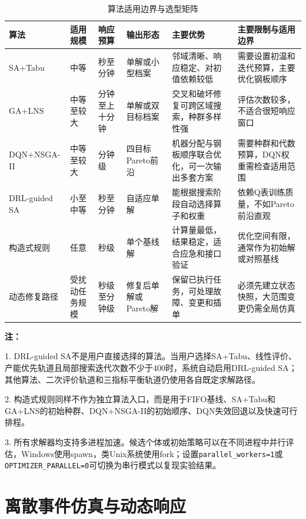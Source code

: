 \documentclass[UTF8,zihao=-4,openany]{ctexrep}
\newcommand{\code}[1]{\texttt{#1}}
\begin{document}
\begin{table}[H]
\centering
\caption{算法适用边界与选型矩阵}
\small
\begin{tabularx}{\textwidth}{p{}p{}p{}p{}YY}
\toprule
算法 & 适用规模 & 响应预算 & 输出形态 & 主要优势 & 主要限制与适用边界 \\
\midrule
SA+Tabu & 中等 & 秒至分钟 & 单解或小型档案 & 邻域清晰、响应稳定、对初值依赖较低 & 需要设置初温和迭代预算，主要优化钢板顺序 \\
GA+LNS & 中等至较大 & 分钟至上十分钟 & 单解或双目标档案 & 交叉和破坏修复可跨区域搜索，种群多样性强 & 评估次数较多，不适合很短响应窗口 \\
DQN+NSGA-II & 中等至较大 & 分钟级 & 四目标Pareto前沿 & 机器分配与钢板顺序联合优化，可一次输出多套方案 & 需要种群和代数预算，DQN权重需检查适用范围 \\
DRL-guided SA & 小至中等 & 秒至分钟 & 自适应单解 & 能根据搜索阶段自动选择算子和权重 & 依赖Q表训练质量，不如Pareto前沿直观 \\
构造式规则 & 任意 & 秒级 & 单个基线解 & 计算量最低，结果稳定，适合应急和接口验证 & 优化空间有限，通常作为初始解或对照基线 \\
动态修复路径 & 受扰动任务规模 & 秒级至分钟级 & 修复后单解或Pareto解 & 保留已执行任务，可处理故障、变更和插单 & 必须先建立状态快照，大范围变更仍需全局仿真 \\
\bottomrule
\end{tabularx}
\vspace{0.5em}
\begin{minipage}{0.96\textwidth}
\small
\textbf{注：}\par
1. DRL-guided SA不是用户直接选择的算法。当用户选择SA+Tabu、线性评价、产能优先轨道且局部搜索迭代次数不少于400时，系统自动启用DRL-guided SA；其他算法、二次评价轨道和三指标平衡轨道仍使用各自既定求解路径。\par

2. 构造式规则同样不作为独立算法入口，而是用于FIFO基线、SA+Tabu和GA+LNS的初始种群、DQN+NSGA-II的初始顺序、DQN失效回退以及快速可行排程。\par

3. 所有求解器均支持多进程加速。候选个体或初始策略可以在不同进程中并行评估，Windows使用spawn，类Unix系统使用fork；设置\code{parallel\_workers=1}或\code{OPTIMIZER\_PARALLEL=0}可切换为串行模式以复现实验结果。
\end{minipage}
\end{table}

\chapter{离散事件仿真与动态响应}
\end{document}
